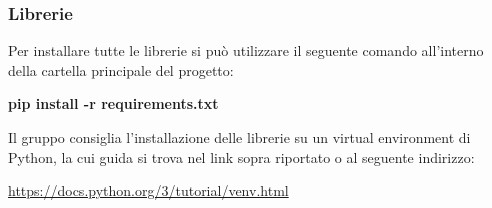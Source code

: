 \subsubsection{Librerie}
\label{sec:Librerie}
Per installare tutte le librerie si può utilizzare il seguente comando all'interno della cartella principale del progetto:\newline{}
\centerline{\textbf{pip install -r requirements.txt}}
Il gruppo consiglia l'installazione delle librerie su un virtual environment di Python, la cui guida si trova nel link sopra riportato o al seguente indirizzo:
\newline{}\centerline{\url{https://docs.python.org/3/tutorial/venv.html}}
